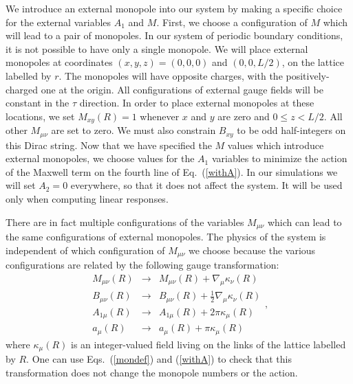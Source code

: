 \documentclass[prb,twocolumn]{revtex4-1}
\begin{document}
We introduce an external monopole into our system by making a specific choice for the external variables $A_1$ and $M$. First, we choose a configuration of $M$ which will lead to a pair of monopoles. In our system of periodic boundary conditions, it is not possible to have only a single monopole. We will place external monopoles at coordinates $(x,y,z)=(0,0,0)$ and $(0,0,L/2)$, on the lattice labelled by $r$. The monopoles will have opposite charges, with the positively-charged one at the origin. All configurations of external gauge fields will be constant in the $\tau$ direction. In order to place external monopoles at these locations, we set $M_{xy}(R)=1$ whenever $x$ and $y$ are zero and $0\leq z<L/2$. All other $M_{\mu\nu}$ are set to zero. We must also constrain $B_{xy}$ to be odd half-integers on this Dirac string. Now that we have specified the $M$ values which introduce external monopoles, we choose values for the $A_1$ variables to minimize the action of the Maxwell term on the fourth line of Eq.~(\ref{withA}). In our simulations we will set $A_2=0$ everywhere, so that it does not affect the system. It will be used only when computing linear responses. 

There are in fact multiple configurations of the variables $M_{\mu\nu}$ which can lead to the same configurations of external monopoles. The physics of the system is independent of which configuration of $M_{\mu\nu}$ we choose because the various configurations are related by the following gauge transformation:
\begin{equation}
\begin{array}{ccc}
M_{\mu\nu}(R)&\rightarrow&M_{\mu\nu}(R)+\nabla_\mu \kappa_\nu(R) \\
B_{\mu\nu}(R)&\rightarrow&B_{\mu\nu}(R)+\frac{1}{2}\nabla_\mu \kappa_\nu(R) \\
A_{1\mu}(R)&\rightarrow&A_{1\mu}(R)+2\pi \kappa_\mu(R)\\
a_\mu(R)&\rightarrow&a_\mu(R)+\pi \kappa_\mu(R)
\end{array},
\end{equation}
where $\kappa_\mu(R)$ is an integer-valued field living on the links of the lattice labelled by $R$. One can use Eqs.~(\ref{mondef}) and (\ref{withA}) to check that this transformation does not change the monopole numbers or the action.
\end{document}
